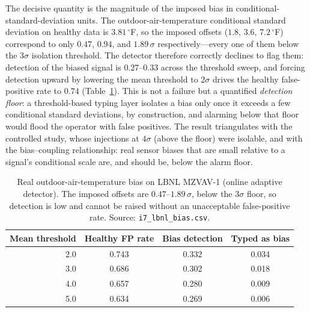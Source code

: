 The decisive quantity is the magnitude of the imposed bias in conditional-standard-deviation units. The outdoor-air-temperature conditional standard deviation on healthy data is $3.81\,^\circ$F, so the imposed offsets ($1.8$, $3.6$, $7.2\,^\circ$F) correspond to only $0.47$, $0.94$, and $1.89\,\sigma$ respectively---every one of them below the $3\sigma$ isolation threshold. The detector therefore correctly declines to flag them: detection of the biased signal is $0.27$--$0.33$ across the threshold sweep, and forcing detection upward by lowering the mean threshold to $2\sigma$ drives the healthy false-positive rate to $0.74$ (Table~\ref{tab:lbnl}). This is not a failure but a quantified \emph{detection floor}: a threshold-based typing layer isolates a bias only once it exceeds a few conditional standard deviations, by construction, and alarming below that floor would flood the operator with false positives. The result triangulates with the controlled study, whose injections at $4\sigma$ (above the floor) were isolable, and with the bias--coupling relationship: real sensor biases that are small relative to a signal's conditional scale are, and should be, below the alarm floor.

\begin{table}[t]
    \centering
    \caption{Real outdoor-air-temperature bias on LBNL MZVAV-1 (online adaptive detector). The imposed offsets are $0.47$--$1.89\,\sigma$, below the $3\sigma$ floor, so detection is low and cannot be raised without an unacceptable false-positive rate. Source: \texttt{i7\_lbnl\_bias.csv}.}
    \label{tab:lbnl}
    \begin{tabular}{rccc}
        \toprule
        Mean threshold & Healthy FP rate & Bias detection & Typed as bias \\
        \midrule
        2.0 & 0.743 & 0.332 & 0.034 \\
        3.0 & 0.686 & 0.302 & 0.018 \\
        4.0 & 0.657 & 0.280 & 0.009 \\
        5.0 & 0.634 & 0.269 & 0.006 \\
        \bottomrule
    \end{tabular}
\end{table}

